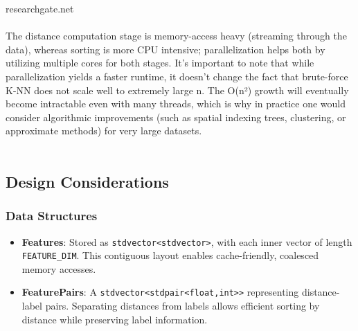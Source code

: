 researchgate.net
\\\\
The distance computation stage is memory-access heavy (streaming through the data), whereas sorting is more CPU intensive; parallelization helps both by utilizing multiple cores for both stages. It’s important to note that while parallelization yields a faster runtime, it doesn’t change the fact that brute-force K-NN does not scale well to extremely large n. The O(n²) growth will eventually become intractable even with many threads, which is why in practice one would consider algorithmic improvements (such as spatial indexing trees, clustering, or approximate methods) for very large datasets. 
\\\\

\subsection{Design Considerations}
\subsubsection{Data Structures}
\begin{itemize}
\item \textbf{Features}: Stored as \texttt{std\:\:vector<std\:\:vector>}, with each inner vector of length \texttt{FEATURE\_DIM}. This contiguous layout enables cache-friendly, coalesced memory accesses.
\item \textbf{FeaturePairs}: A \texttt{std\:\:vector<std\:\:pair<float,int>>} representing distance-label pairs.  Separating distances from labels allows efficient sorting by distance while preserving label information.
\end{itemize}

